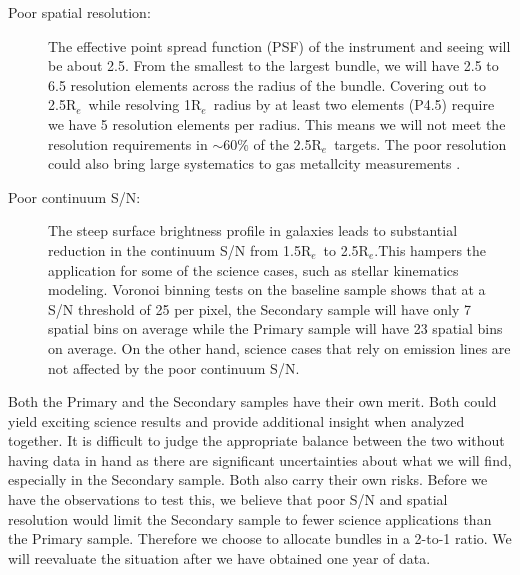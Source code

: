 \documentclass[preprint,11pt]{aastex}
\newcommand{\Reff}{{R$_{e}$}}
\begin{document}
\begin{description}
\item[Poor spatial resolution:] The effective point spread function
  (PSF) of the instrument and seeing will be about 2.5\arcsec. From
  the smallest to the largest bundle, we will have 2.5 to 6.5
  resolution elements across the radius of the bundle. Covering out to
  2.5\Reff\ while resolving 1\Reff\ radius by at least two elements
  (P4.5) require we have 5 resolution elements per radius. This means
  we will not meet the resolution requirements in $\sim60\%$ of the
  2.5\Reff\ targets. The poor resolution could also bring large
  systematics to gas metallcity measurements \citep{yuan13,mast13}.

\item[Poor continuum S/N:] The steep surface brightness profile in
  galaxies leads to substantial reduction in the continuum S/N from
  1.5\Reff\ to 2.5\Reff.This hampers the application for some of the
  science cases, such as stellar kinematics modeling. Voronoi binning
  tests on the baseline sample shows that at a S/N threshold of 25 per
  pixel, the Secondary sample will have only 7 spatial bins on average
  while the Primary sample will have 23 spatial bins on average. On
  the other hand, science cases that rely on emission lines are not affected
  by the poor continuum S/N.
\end{description}

Both the Primary and the Secondary samples have their own merit. Both
could yield exciting science results and provide additional insight
when analyzed together. It is difficult to judge the appropriate
balance between the two without having data in hand as there are
significant uncertainties about what we will find, especially in the
Secondary sample. Both also carry their own risks. Before we have the
observations to test this, we believe that poor S/N and spatial
resolution would limit the Secondary sample to fewer science
applications than the Primary sample.  Therefore we choose to allocate
bundles in a 2-to-1 ratio.  We will reevaluate the situation after we
have obtained one year of data.


\end{document}
